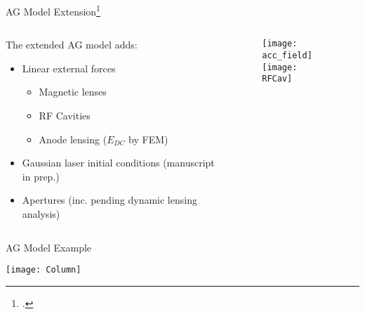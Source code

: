\begin{frame}{AG Model Extension\footcite{berger_semi-analytic_2010}}
\begin{columns}
  \begin{column}{0.54\linewidth}
    The extended AG model adds:
    \begin{itemize}
      \item Linear external forces
      \begin{itemize}
        \item<2-> Magnetic lenses
        \item<2-> RF Cavities
        \item<3-> Anode lensing ($E_{DC}$ by FEM)
      \end{itemize}
      \item<4-> Gaussian laser initial conditions (manuscript in prep.)
      \item<5-> Apertures (inc. pending dynamic lensing analysis)
    \end{itemize}
  \end{column}
  \begin{column}{0.4\linewidth}
    \begin{figure}
      \centering
      \texttt{[image: acc\_field]}\\
      \texttt{[image: RFCav]}
    \end{figure}
  \end{column}
\end{columns}
\end{frame}

\begin{frame}{AG Model Example}
  \begin{center}
    \texttt{[image: Column]}
  \end{center}
\end{frame}
